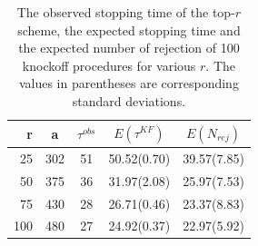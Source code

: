 \documentclass[a4paper,12pt]{article}
\begin{document}
\begin{table}[htbp]
  \centering
  \caption{The observed stopping time of the top-$r$ scheme, the expected stopping time and the expected number of rejection of 100 knockoff procedures for various $r$. The values in parentheses are corresponding standard deviations.}
    \begin{tabular}{rcccc}
    \midrule
    r& a & $\tau^{obs}$ & $E(\tau^{KF})$ & $E(N_{rej})$ \\
        \midrule
    25 & 302 & 51 & 50.52(0.70) & 39.57(7.85) \\
    50 & 375 & 36 & 31.97(2.08) & 25.97(7.53) \\
    75 & 430 & 28 & 26.71(0.46) & 23.37(8.83) \\
    100 & 480 & 27 & 24.92(0.37) & 22.97(5.92) \\
        \midrule
    \end{tabular}%
  \label{emp}%
\end{table}%
\end{document}
